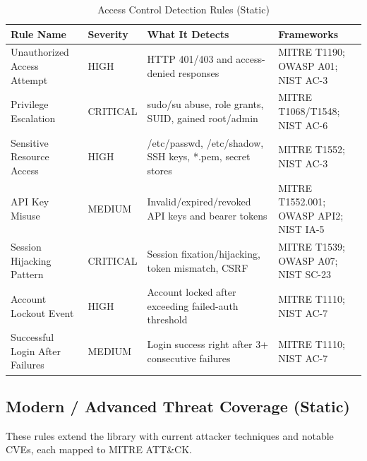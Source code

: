 \documentclass[12pt,a4paper]{article}
\begin{document}
\begin{table}[H]
\centering
\begin{tabular}{|p{4.2cm}|p{1.9cm}|p{4.6cm}|p{4.2cm}|}
\hline
\textbf{Rule Name} & \textbf{Severity} & \textbf{What It Detects} & \textbf{Frameworks} \\
\hline
Unauthorized Access Attempt & HIGH & HTTP 401/403 and access-denied responses & MITRE T1190; OWASP A01; NIST AC-3 \\
\hline
Privilege Escalation & CRITICAL & sudo/su abuse, role grants, SUID, gained root/admin & MITRE T1068/T1548; NIST AC-6 \\
\hline
Sensitive Resource Access & HIGH & /etc/passwd, /etc/shadow, SSH keys, *.pem, secret stores & MITRE T1552; NIST AC-3 \\
\hline
API Key Misuse & MEDIUM & Invalid/expired/revoked API keys and bearer tokens & MITRE T1552.001; OWASP API2; NIST IA-5 \\
\hline
Session Hijacking Pattern & CRITICAL & Session fixation/hijacking, token mismatch, CSRF & MITRE T1539; OWASP A07; NIST SC-23 \\
\hline
Account Lockout Event & HIGH & Account locked after exceeding failed-auth threshold & MITRE T1110; NIST AC-7 \\
\hline
Successful Login After Failures & MEDIUM & Login success right after 3+ consecutive failures & MITRE T1110; NIST AC-7 \\
\hline
\end{tabular}
\caption{Access Control Detection Rules (Static)}
\label{tab:access-rules}
\end{table}
\newpage
\subsection{Modern / Advanced Threat Coverage (Static)}

These rules extend the library with current attacker techniques and notable CVEs, each mapped
to MITRE ATT\&CK.
\end{document}
